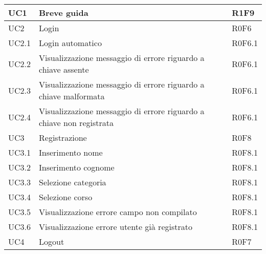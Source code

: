 \documentclass[AnalisiDeiRequisiti.tex]{subfiles}
\begin{document}
\begin{longtable}[H]{|p{2cm}|p{5cm}|p{5cm}|}
	UC1 & Breve guida & R1F9 \\ \hline
	UC2 & Login & R0F6 \\ \hline
	UC2.1 & Login automatico & R0F6.1 \\ \hline
	UC2.2 & Visualizzazione messaggio di errore riguardo a chiave assente & R0F6.1 \\ \hline
	UC2.3 & Visualizzazione messaggio di errore riguardo a chiave malformata & R0F6.1 \\ \hline
	UC2.4 & Visualizzazione messaggio di errore riguardo a chiave non registrata & R0F6.1 \\ \hline
	UC3 & Registrazione & R0F8 \\ \hline %
	UC3.1 & Inserimento nome & R0F8.1 \\ \hline
	UC3.2 & Inserimento cognome & R0F8.1 \\ \hline
	UC3.3 & Selezione categoria & R0F8.1 \\ \hline
	UC3.4 & Selezione corso & R0F8.1 \\ \hline
	UC3.5 & Visualizzazione errore campo non compilato & R0F8.1 \\ \hline
	UC3.6 & Visualizzazione errore utente già registrato & R0F8.1 \\ \hline
	UC4 & Logout & R0F7 \\ \hline
	

\end{longtable}
\end{document}
